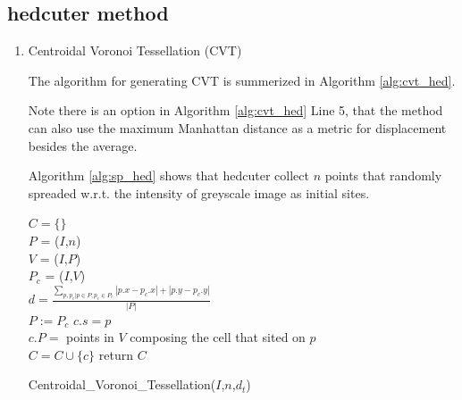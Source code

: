 \documentclass[11pt]{article}
\begin{document}
\subsection{hedcuter method}
\begin{enumerate}

\item Centroidal Voronoi Tessellation (CVT)

The algorithm for generating CVT is summerized in  Algorithm \ref{alg:cvt_hed}.

Note there is an option in Algorithm \ref{alg:cvt_hed} Line 5, that the method can also use the maximum Manhattan distance as a metric for displacement besides the average.

Algorithm \ref{alg:sp_hed} shows that hedcuter collect $n$ points that randomly spreaded w.r.t. the intensity of greyscale image  as initial sites.

\begin{algorithm}[H]
    	   $C = \lbrace \rbrace$\\
    	$P$ = \SampleInitialPoints($I$,$n$)\\
    {
   	$V$ = \Voronoi($I$,$P$)\\
   	$P_c$ =  \Centroidal($I$,$V$)\\
   	$d =\frac{\sum_{p,p_c | p \in P, p_c \in P_c} {|p.x-p_c.x|+|p.y-p_c.y|}}{|P|} $\\
   	$P:=P_c$
   }
    {
      $c.s = p $\\
      $c.P = $ points in $V$ composing the cell that sited on $p$\\
      $C= C\cup  \lbrace c \rbrace$
   }   
      return $C$
    \caption{Centroidal\_Voronoi\_Tessellation($I$,$n$,$d_t$)}
        \label{alg:cvt_hed}
\end{algorithm}


\end{enumerate}
\end{document}
